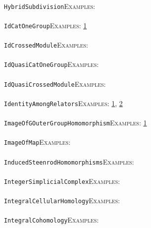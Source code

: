 \documentclass[a4paper,11pt]{report}
\begin{document}
{{ \\
 \texttt{HybridSubdivision}{\nobreakspace}{\nobreakspace}{\nobreakspace}{\nobreakspace}\textsc{Examples:} \\
 \\
 \texttt{IdCatOneGroup}{\nobreakspace}{\nobreakspace}{\nobreakspace}{\nobreakspace}\textsc{Examples:} \href{../www/SideLinks/About/aboutquasi.html} {1}{\nobreakspace} \\
 \\
 \texttt{IdCrossedModule}{\nobreakspace}{\nobreakspace}{\nobreakspace}{\nobreakspace}\textsc{Examples:} \\
 \\
 \texttt{IdQuasiCatOneGroup}{\nobreakspace}{\nobreakspace}{\nobreakspace}{\nobreakspace}\textsc{Examples:} \\
 \\
 \texttt{IdQuasiCrossedModule}{\nobreakspace}{\nobreakspace}{\nobreakspace}{\nobreakspace}\textsc{Examples:} \\
 \\
 \texttt{IdentityAmongRelators}{\nobreakspace}{\nobreakspace}{\nobreakspace}{\nobreakspace}\textsc{Examples:} \href{../www/SideLinks/About/aboutPeriodic.html} {1}{\nobreakspace}, \href{../www/SideLinks/About/aboutTopology.html} {2}{\nobreakspace} \\
 \\
 \texttt{ImageOfGOuterGroupHomomorphism}{\nobreakspace}{\nobreakspace}{\nobreakspace}{\nobreakspace}\textsc{Examples:} \href{../www/SideLinks/About/aboutCoefficientSequence.html} {1}{\nobreakspace} \\
 \\
 \texttt{ImageOfMap}{\nobreakspace}{\nobreakspace}{\nobreakspace}{\nobreakspace}\textsc{Examples:} \\
 \\
 \texttt{InducedSteenrodHomomorphisms}{\nobreakspace}{\nobreakspace}{\nobreakspace}{\nobreakspace}\textsc{Examples:} \\
 \\
 \texttt{IntegerSimplicialComplex}{\nobreakspace}{\nobreakspace}{\nobreakspace}{\nobreakspace}\textsc{Examples:} \\
 \\
 \texttt{IntegralCellularHomology}{\nobreakspace}{\nobreakspace}{\nobreakspace}{\nobreakspace}\textsc{Examples:} \\
 \\
 \texttt{IntegralCohomology}{\nobreakspace}{\nobreakspace}{\nobreakspace}{\nobreakspace}\textsc{Examples:} \\
}}
\end{document}
